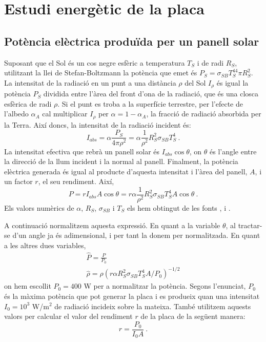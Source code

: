 \documentclass[11pt]{article}
\begin{document}
\section{Estudi energètic de la placa}
\subsection{Potència elèctrica produïda per un panell solar}
Suposant que el Sol és un cos negre esfèric a temperatura $T_S$ i de radi $R_S$, utilitzant la llei de Stefan-Boltzmann la potència que emet és $P_S=\sigma_{SB}T_S^44\pi R_S^2$. La intensitat de la radiació en un punt a una distància ${\rho}$ del Sol $I_{\rho}$ és igual la potència $P_S$ dividida entre l'àrea del front d'ona de la radiació, que és una closca esfèrica de radi ${\rho}$. Si el punt es troba a la superfície terrestre,  per l’efecte de l’albedo $\alpha_A$ cal multiplicar $I_{\rho}$ per $\alpha=1-\alpha_A$, la fracció de radiació absorbida per la Terra. Així doncs, la intensitat de la radiació incident és:
\begin{equation}
    I_{abs} = \alpha \frac{P_S}{4\pi \rho^2}=\alpha \frac{1}{\rho^2} R_S^2\sigma_{SB} T_S^4 \ .
    \label{I_abs}
\end{equation}
La intensitat efectiva que rebrà un panell solar és $I_{abs} \cos{\theta}$, on $\theta$ és l'angle entre la direcció de la llum incident i la normal al panell. Finalment, la potència elèctrica generada és igual al producte d'aquesta intensitat i l'àrea del panell, $A$, i un factor $r$, el seu rendiment. Així,
\begin{equation}
    P = r I_{abs} A \cos{\theta} = r \alpha \frac{1}{\rho^2}R_S^2\sigma_{SB}T_S^4A \cos{\theta} \ .
    \label{potencia placa}
\end{equation}
Els valors numèrics de $\alpha$, $R_S$, $\sigma_{SB}$ i $T_S$ els hem obtingut de les fonts \cite{Earth}, \cite{Sun} i \cite{Universe}.

A continuació normalitzem aquesta expressió. En quant a la variable $\theta$, al tractar-se d'un angle ja és adimensional, i per tant la donem per normalitzada. En quant a les altres dues variables,
\begin{align}
    \hat{P}=\frac{P}{P_0} \label{P normalizada} \\
    \hat{\rho}= \rho \left( r \alpha R_S^2\sigma_{SB}T_S^4A/P_0 \right)^{-1/2} \label{rho normalizada}
\end{align}
on hem escollit $P_0=400$ W per a normalitzar la potència. Segons l'enunciat, $P_0$ és la màxima potència que pot generar la placa i es produeix quan una intensitat $I_0=10^3$ W/$\text{m}^2$ de radiació incideix sobre la mateixa. També utilitzem aquests valors per calcular el valor del rendiment $r$ de la placa de la següent manera:
\begin{equation}
     r = \frac{P_0}{I_0A} \ .
\end{equation}
\end{document}
